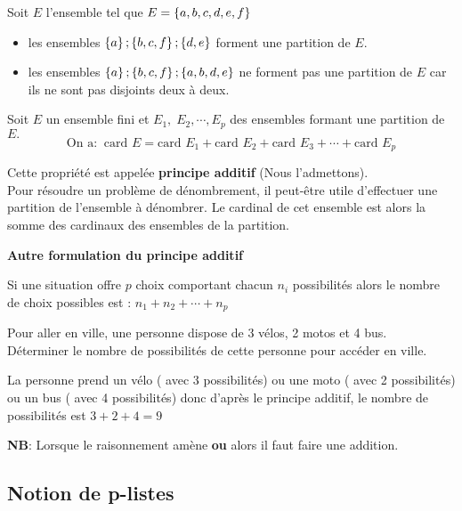 \begin{example}

Soit $ E $ l'ensemble tel que $ E= \left\{a, b, c, d, e, f\right\} $
\begin{itemize}
\item[\textbullet] les ensembles  $ \left\{a\right\}; \left\{b, c,  f\right\}; \left\{d,e\right\} $ forment une partition de $ E. $
\item[\textbullet] les ensembles  $ \left\{a\right\}; \left\{b, c,  f\right\}; \left\{a, b,d,e\right\} $ ne  forment pas une partition de $ E$ car ils ne  sont pas disjoints deux à deux.
\end{itemize}
\end{example}
\begin{property}
Soit $ E $ un ensemble fini et  $ E_{1}, \; E_{2}, \cdots, E_{p} $ des ensembles formant une partition de $ E. $ 
 $$ \text{On a:}\;\;   \textrm{card }E= \textrm{card } E_{1}+ \textrm{card }E_{2} + \textrm{card }E_{3}+ \cdots + \textrm{card } E_{p}$$
\end{property}
Cette propriété est appelée \textbf{principe  additif }(Nous l'admettons).\\
Pour résoudre un problème de dénombrement, il peut-être utile d'effectuer une partition de l'ensemble à dénombrer. Le cardinal de cet ensemble est alors la somme des cardinaux des   ensembles de la partition.

\textbf{ Autre formulation du principe additif}

Si une situation offre $ p $ choix comportant chacun $ n_{i} $ possibilités alors le nombre de choix possibles est :
$n_{1}+ n_{2}+ \cdots + n_{p} $

\begin{example}

 Pour aller en ville, une personne dispose de 3 vélos, 2 motos  et 4 bus.\\
Déterminer le nombre de possibilités de cette personne pour accéder en ville.

  La personne prend un vélo ( avec 3 possibilités) ou une moto ( avec 2 possibilités) ou un bus ( avec 4 possibilités) donc d'après le principe additif,  le nombre de possibilités est $ 3+2+4= 9$ 
\end{example}

\textbf{NB}: Lorsque le raisonnement amène \textbf{ou}   alors il faut faire une  addition.

\subsection{ Notion de   p-listes}

